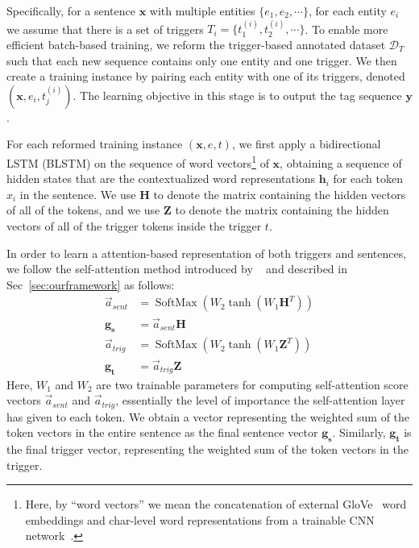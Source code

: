 Specifically,
for a sentence $\mathbf{x}$ with multiple entities $\{e_1, e_2,\cdots\}$, for each entity $e_i$ we assume that there is a set of triggers $T_i=\{t^{(i)}_1, t^{(i)}_2, \cdots\}$.
To enable more efficient batch-based training, we reform the trigger-based annotated dataset $\mathcal{D}_{T}$ such that each new sequence contains only one entity and one trigger.
We then create a training instance by pairing each entity with one of its triggers, denoted $(\mathbf{x}, e_i, t^{(i)}_j)$.
The learning objective in this stage is to output the tag sequence $\mathbf{y}$. %


For each reformed training instance $(\mathbf{x}, e, t)$, we first apply a bidirectional LSTM (BLSTM) on the sequence of word vectors\footnote{Here, by ``word vectors'' we mean the concatenation of external GloVe~\citep{Pennington2014GloveGV} word embeddings and char-level word representations from a trainable CNN network~\citep{DBLP:conf/acl/MaH16}.} 
of $\mathbf{x}$, obtaining a sequence of hidden states that are the contextualized word representations $\mathbf{h}_i$ for each token $x_i$ in the sentence. 
We use $\mathbf{H}$ to denote the matrix containing the hidden vectors of all of the tokens, and we use $\mathbf{Z}$ to denote the matrix containing the hidden vectors of all of the trigger tokens inside the trigger $t$.

In order to learn a attention-based
representation of both triggers and sentences, we follow the self-attention method introduced by ~\cite{selfattentive} and described in Sec~\ref{sec:ourframework} as follows:
{
{
		\begin{align*} 
			\vec{a}_{sent}&=\operatorname{SoftMax}\left(W_{2} \tanh \left(W_{1} \mathbf{H}^{T}\right)\right)\\
			\mathbf{g_s}&=\vec{a}_{sent}\mathbf{H}\\
			\vec{a}_{trig}&=\operatorname{SoftMax}\left(W_{2} \tanh \left(W_{1} \mathbf{Z}^{T}\right)\right)\\
			\mathbf{g_t}&=\vec{a}_{trig}\mathbf{Z}
		\end{align*} 
	}
}  
Here, $W_1$ and $W_2$ are two trainable parameters for computing self-attention score vectors $\vec{a}_{sent}$ and $\vec{a}_{trig}$, essentially the level of importance the self-attention layer has given to each token.
We obtain a vector representing the weighted sum of the token vectors in the entire sentence as the final sentence vector $\mathbf{g_s}$. Similarly, $\mathbf{g_t}$ is the final trigger vector, representing the weighted sum of the token vectors in the trigger.

